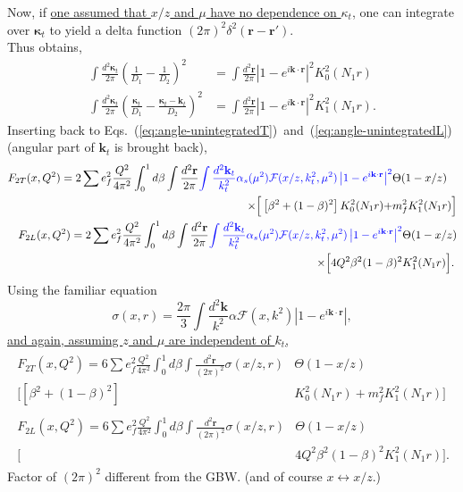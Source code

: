 Now,  if \underline{\color{blue} one assumed that $x/z$ and $\mu$ have no dependence on $\kappa_t$,} one can integrate over $\boldsymbol{\kappa}_t$ to yield a delta function $(2\pi)^2 \delta^2(\mathbf{r}-\mathbf{r}')$.\\
Thus obtains,
\begin{align}
\int \frac{d^2\boldsymbol{\kappa}_t}{2\pi}\left(\frac{1}{D_1}-\frac{1}{D_2}\right)^2
&=\int\frac{d^2\mathbf{r}}{2\pi}
\left |1 -e^{i\mathbf{k}\cdot \mathbf{r}}
\right|^2
K_0^2(N_1 r)
\\
\int \frac{d^2\boldsymbol{\kappa}_t}{2\pi}\left(\frac{\boldsymbol{\kappa}_t}{D_1}-\frac{\boldsymbol{\kappa}_t-\mathbf{k}_t}{D_2}\right)^2&
=\int\frac{d^2\mathbf{r}}{2\pi}
\left|1 -e^{i\mathbf{k}\cdot \mathbf{r}}
\right|^2
K_1^2(N_1 r).
\end{align}
Inserting back to Eqs.~(\ref{eq:angle-unintegratedT})~and~(\ref{eq:angle-unintegratedL}) (angular part of $\mathbf{k}_t$ is brought back),
\begin{align}
\begin{split}
F_{2T}(x,Q^2)=2\sum e^2_f\frac{Q^2}{4\pi^2}\int^1_0 d\beta\int\frac{d^2\mathbf{r}}{2\pi}
{\color{blue}\int\frac{d^2 \mathbf{k}_t}{k_t^2} \alpha_s(\mu^2)\mathcal{F}(x/z,k^2_t,\mu^2)\left |1 -e^{i\mathbf{k}\cdot \mathbf{r}}
\right|^2
}
&\Theta(1-x/z)\\
\times
\Big[
\left[\beta^2+(1-\beta)^2\right]
K_0^2(N_1 r)+&m_f^2
K_1^2(N_1 r)
\Big]
\end{split}\\
\begin{split}
F_{2L}(x,Q^2)=2\sum e^2_f\frac{Q^2}{4\pi^2}\int^1_0 d\beta \int\frac{d^2\mathbf{r}}{2\pi}
{\color{blue}\int\frac{d^2 \mathbf{k}_t}{k_t^2}
\alpha_s(\mu^2)\mathcal{F}(x/z,k^2_t,\mu^2)\left|1 -e^{i\mathbf{k}\cdot \mathbf{r}}
\right|^2
}
&\Theta(1-x/z)\\
\times
\Big[
4Q^2\beta^2 (1-\beta)^2&
K_1^2(N_1 r)
\Big].
\end{split}
\end{align}
Using the familiar equation
\begin{equation}
\sigma(x,r)=\frac{2\pi}{3}\int\frac{d^2\mathbf{k}}{k^2}\alpha\mathcal{F}(x,k^2)\left|1-e^{i \mathbf{k}\cdot\mathbf{r}}\right|,
\end{equation}
\underline{\color{blue}and again, assuming $z$ and $\mu$ are independent of $k_t$,}
\begin{align}
\begin{split}
F_{2T}(x,Q^2)=6\sum e^2_f\frac{Q^2}{4\pi^2}\int^1_0 d\beta\int\frac{d^2\mathbf{r}}{(2\pi)^2}
\sigma(x/z,r)
&\Theta(1-x/z)\\
\Big[
\left[\beta^2+(1-\beta)^2\right]&
K_0^2(N_1 r)
+m_f^2
K_1^2(N_1 r)
\Big]
\end{split}\\
\begin{split}
F_{2L}(x,Q^2)=6\sum e^2_f\frac{Q^2}{4\pi^2}\int^1_0 d\beta \int\frac{d^2\mathbf{r}}{(2\pi)^2}
\sigma(x/z,r)
&\Theta(1-x/z)\\
\Big[&
4Q^2\beta^2 (1-\beta)^2
K_1^2(N_1 r)
\Big].
\end{split}
\end{align}
{\color{red} Factor of $(2\pi)^2$ different from the GBW.} (and of course  $x\leftrightarrow x/z$.)

